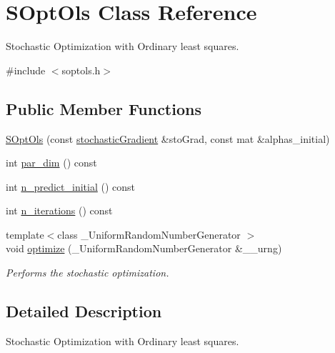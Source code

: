 \hypertarget{classSOptOls}{\section{S\-Opt\-Ols Class Reference}
\label{classSOptOls}
}


Stochastic Optimization with Ordinary least squares.  




{\ttfamily \#include $<$soptols.\-h$>$}

\subsection*{Public Member Functions}
\begin{DoxyCompactItemize}
\item 
\hyperlink{classSOptOls_a07ab78fade06a9533d615c4af0a6e912}{S\-Opt\-Ols} (const \hyperlink{classstochasticGradient}{stochastic\-Gradient} \&sto\-Grad, const mat \&alphas\-\_\-initial)
\item 
int \hyperlink{classSOptOls_af2d8f484784318e0e39fe05822dbee2f}{par\-\_\-dim} () const 
\item 
int \hyperlink{classSOptOls_a1147631d88e88158167e5881c1130541}{n\-\_\-predict\-\_\-initial} () const 
\item 
int \hyperlink{classSOptOls_ae880fed3f6f2b52f79d9024be0f6f979}{n\-\_\-iterations} () const 
\item 
\hypertarget{classSOptOls_ac56e8276e341b57b1c2e206efd702822}{{\footnotesize template$<$class \-\_\-\-Uniform\-Random\-Number\-Generator $>$ }\\void \hyperlink{classSOptOls_ac56e8276e341b57b1c2e206efd702822}{optimize} (\-\_\-\-Uniform\-Random\-Number\-Generator \&\-\_\-\-\_\-urng)}\label{classSOptOls_ac56e8276e341b57b1c2e206efd702822}

\begin{DoxyCompactList}\small\item\em Performs the stochastic optimization. \end{DoxyCompactList}\end{DoxyCompactItemize}


\subsection{Detailed Description}
Stochastic Optimization with Ordinary least squares. 


